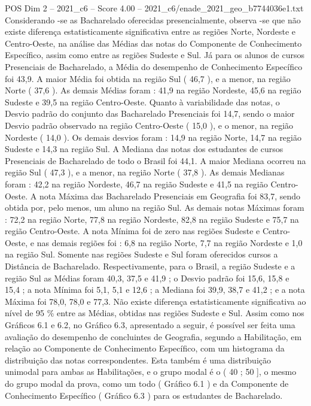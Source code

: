 \begin{textsample}{POS Dim 2 – 2021\_c6 – Score 4.00 – 2021\_c6/enade\_2021\_geo\_b7744036e1.txt}
Considerando -se as Bacharelado oferecidas presencialmente, observa -se que não existe diferença estatisticamente significativa entre as regiões Norte, Nordeste e Centro-Oeste, na análise das Médias das notas do Componente de Conhecimento Específico, assim como entre as regiões Sudeste e Sul.
Já para os alunos de cursos Presenciais de Bacharelado, a Média do desempenho de Conhecimento Específico foi 43,9.
A maior Média foi obtida na região Sul ( 46,7 ), e a menor, na região Norte ( 37,6 ).
As demais Médias foram : 41,9 na região Nordeste, 45,6 na região Sudeste e 39,5 na região Centro-Oeste.
Quanto à variabilidade das notas, o Desvio padrão do conjunto das Bacharelado Presenciais foi 14,7, sendo o maior Desvio padrão observado na região Centro-Oeste ( 15,0 ), e o menor, na região Nordeste ( 14,0 ).
Os demais desvios foram : 14,9 na região Norte, 14,7 na região Sudeste e 14,3 na região Sul.
A Mediana das notas dos estudantes de cursos Presenciais de Bacharelado de todo o Brasil foi 44,1.
A maior Mediana ocorreu na região Sul ( 47,3 ), e a menor, na região Norte ( 37,8 ).
As demais Medianas foram : 42,2 na região Nordeste, 46,7 na região Sudeste e 41,5 na região Centro-Oeste.
A nota Máxima das Bacharelado Presenciais em Geografia foi 83,7, sendo obtida por, pelo menos, um aluno na região Sul.
As demais notas Máximas foram : 72,2 na região Norte, 77,8 na região Nordeste, 82,8 na região Sudeste e 75,7 na região Centro-Oeste.
A nota Mínima foi de zero nas regiões Sudeste e Centro-Oeste, e nas demais regiões foi : 6,8 na região Norte, 7,7 na região Nordeste e 1,0 na região Sul.
Somente nas regiões Sudeste e Sul foram oferecidos cursos a Distância de Bacharelado.
Respectivamente, para o Brasil, a região Sudeste e a região Sul as Médias foram 40,3, 37,5 e 41,9 ; o Desvio padrão foi 15,6, 15,8 e 15,4 ; a nota Mínima foi 5,1, 5,1 e 12,6 ; a Mediana foi 39,9, 38,7 e 41,2 ; e a nota Máxima foi 78,0, 78,0 e 77,3.
Não existe diferença estatisticamente significativa ao nível de 95 \% entre as Médias, obtidas nas regiões Sudeste e Sul.
Assim como nos Gráficos 6.1 e 6.2, no Gráfico 6.3, apresentado a seguir, é possível ser feita uma avaliação do desempenho de concluintes de Geografia, segundo a Habilitação, em relação ao Componente de Conhecimento Específico, com um histograma da distribuição das notas correspondentes.
Esta também é uma distribuição unimodal para ambas as Habilitações, e o grupo modal é o ( 40 ; 50 ], o mesmo do grupo modal da prova, como um todo ( Gráfico 6.1 ) e da Componente de Conhecimento Específico ( Gráfico 6.3 ) para os estudantes de Bacharelado.

\end{textsample}
